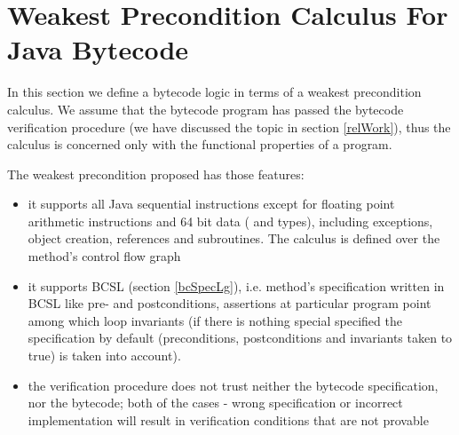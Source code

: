 
\section{Weakest Precondition Calculus For Java Bytecode}\label{wpbc}
In this section we define a bytecode logic in terms of a weakest precondition calculus.
We assume that the bytecode program has passed the bytecode verification procedure (we have discussed the topic in section \ref{relWork}), thus the calculus is concerned only with the functional properties  of a program. 

The weakest precondition proposed has those features:
\begin{itemize}
\item it supports all Java sequential instructions except for floating point arithmetic instructions and 64 bit data ( and  types), including 
exceptions, object creation, references and subroutines. The calculus is defined over the method's control flow graph

\item it supports BCSL (section \ref{bcSpecLg}), i.e. method's specification written in BCSL like pre- and postconditions, assertions at particular program point among 
which loop invariants (if there is nothing special specified the specification by default (preconditions, postconditions and invariants taken to true) is taken into account). %
\item the verification procedure does not trust neither the bytecode specification, nor the bytecode; both of the cases - wrong 
specification or incorrect implementation will result in verification conditions that are not provable 
\end{itemize}



